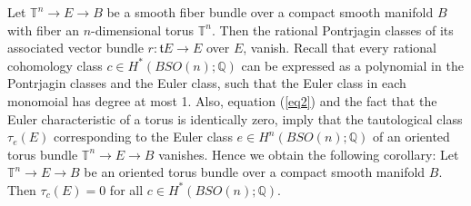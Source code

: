\documentclass[onecolumn,notitlepage,11pt]{article}
\newcommand{\Q}{\mathbb{Q}}
\newcommand{\T}{\mathbb{T}}
\newenvironment{customthm}[1]
  {\renewcommand\theinnercustomthm{#1}\innercustomthm}
  {\endinnercustomthm}  %
\newenvironment{customcoro}[1]
  {\renewcommand\theinnercustomcoro{#1}\innercustomcoro}
  {\endinnercustomcoro}
\theoremstyle{definition}
\begin{document}
\begin{customthm}{D}\label{torus}
Let $\T^n\to E\to B$ be a smooth fiber bundle over a compact smooth manifold $B$ with fiber an $n$-dimensional
torus $\T^n$. Then the rational Pontrjagin
classes of its associated vector bundle $r:\mathfrak{t}E\to E$ over
$E$, vanish.
\end{customthm}
Recall that every rational cohomology class $ c\in H^*(BSO(n);\Q)$
can be expressed as a polynomial in the Pontrjagin classes and
the Euler class, such that the Euler class in each monomoial
has degree at most 1. Also, equation (\ref{eq2}) and
the fact that the Euler characteristic of a torus is 
identically zero, imply that
the tautological class $\tau_e(E)$ 
corresponding to the Euler class 
$e\in H^n(BSO(n);\Q)$ of an oriented
torus bundle $\T^n\to E\to B$ vanishes. Hence
we obtain the following corollary:
\begin{customcoro}{D.1}\label{vanishingtorus}
Let  $\T^n\to E\to B$ be an oriented torus bundle
over a compact smooth
manifold $B$. Then $\tau_c(E)=0$ 
for all $c\in H^*(BSO(n);\Q)$.
\end{customcoro}
\end{document}
